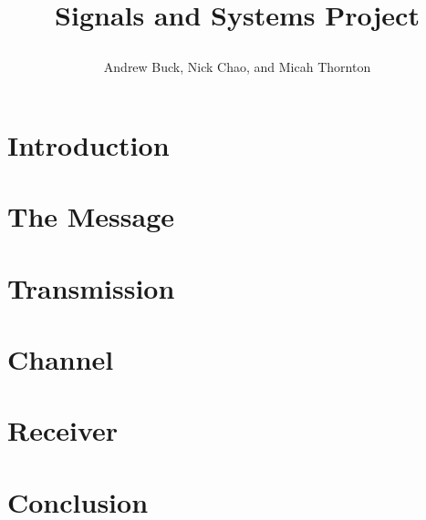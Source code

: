 \documentclass{IEEEtran}
\title{Signals and Systems Project \author{Andrew Buck, Nick Chao, and Micah Thornton}}
\begin{document}
\maketitle{} 

\begin{abstract}

\end{abstract}

\tableofcontents{} 

\section{Introduction}


\section{The Message}


\section{Transmission}


\section{Channel}


\section{Receiver}


\section{Conclusion}

\end{document}
